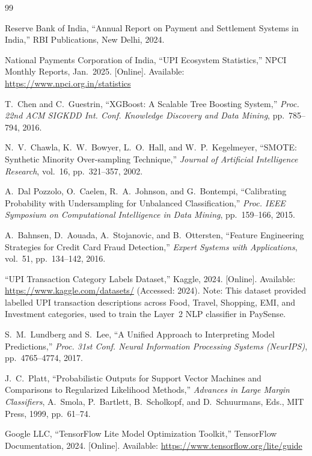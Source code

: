 \documentclass[conference]{IEEEtran}
\begin{document}
\begin{thebibliography}{99}

Reserve Bank of India,
``Annual Report on Payment and Settlement Systems in India,''
RBI Publications, New Delhi, 2024.

National Payments Corporation of India,
``UPI Ecosystem Statistics,'' NPCI Monthly Reports, Jan.~2025.
[Online]. Available: \url{https://www.npci.org.in/statistics}

T.~Chen and C.~Guestrin,
``XGBoost: A Scalable Tree Boosting System,''
\textit{Proc. 22nd ACM SIGKDD Int. Conf. Knowledge Discovery and Data Mining},
pp.~785--794, 2016.

N.~V.~Chawla, K.~W.~Bowyer, L.~O.~Hall, and W.~P.~Kegelmeyer,
``SMOTE: Synthetic Minority Over-sampling Technique,''
\textit{Journal of Artificial Intelligence Research},
vol.~16, pp.~321--357, 2002.

A.~Dal Pozzolo, O.~Caelen, R.~A.~Johnson, and G.~Bontempi,
``Calibrating Probability with Undersampling for Unbalanced Classification,''
\textit{Proc. IEEE Symposium on Computational Intelligence in Data Mining},
pp.~159--166, 2015.

A.~Bahnsen, D.~Aouada, A.~Stojanovic, and B.~Ottersten,
``Feature Engineering Strategies for Credit Card Fraud Detection,''
\textit{Expert Systems with Applications}, vol.~51, pp.~134--142, 2016.

``UPI Transaction Category Labels Dataset,''
Kaggle, 2024. [Online]. Available:
\url{https://www.kaggle.com/datasets/}
(Accessed: 2024).
Note: This dataset provided labelled UPI transaction descriptions
across Food, Travel, Shopping, EMI, and Investment categories,
used to train the Layer~2 NLP classifier in PaySense.

S.~M.~Lundberg and S.~Lee,
``A Unified Approach to Interpreting Model Predictions,''
\textit{Proc. 31st Conf. Neural Information Processing Systems (NeurIPS)},
pp.~4765--4774, 2017.

J.~C.~Platt,
``Probabilistic Outputs for Support Vector Machines and Comparisons
to Regularized Likelihood Methods,''
\textit{Advances in Large Margin Classifiers},
A.~Smola, P.~Bartlett, B.~Scholkopf, and D.~Schuurmans, Eds.,
MIT Press, 1999, pp.~61--74.

Google LLC,
``TensorFlow Lite Model Optimization Toolkit,''
TensorFlow Documentation, 2024.
[Online]. Available: \url{https://www.tensorflow.org/lite/guide}

\end{thebibliography}

\balance
\end{document}
